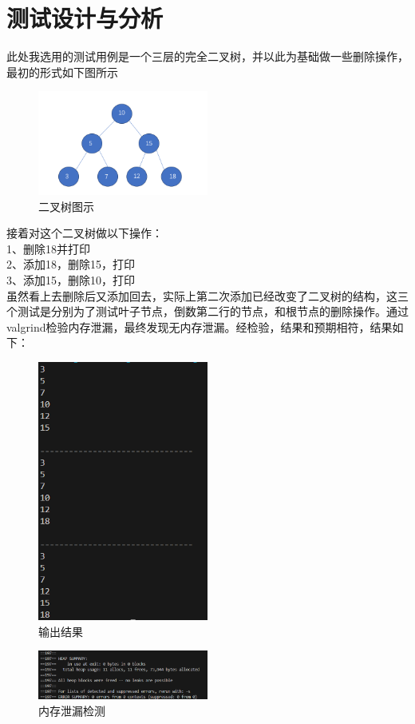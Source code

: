 \documentclass[UTF8]{ctexart}
\begin{document}
\section{测试设计与分析}
\indent 此处我选用的测试用例是一个三层的完全二叉树，并以此为基础做一些删除操作，最初的形式如下图所示
\begin{figure}[htbp] 
\centering 
\includegraphics[width=0.5\textwidth]{1.png} 
\caption{二叉树图示}
\end{figure}
\newpage
\noindent 接着对这个二叉树做以下操作：\\
1、删除18并打印\\
2、添加18，删除15，打印\\
3、添加15，删除10，打印\\
虽然看上去删除后又添加回去，实际上第二次添加已经改变了二叉树的结构，这三个测试是分别为了测试叶子节点，倒数第二行的节点，和根节点的删除操作。通过valgrind检验内存泄漏，最终发现无内存泄漏。经检验，结果和预期相符，结果如下：\\
\begin{figure}[!h] 
\centering 
\includegraphics[width=0.5\textwidth]{2.png} 
\caption{输出结果}
\end{figure}
\begin{figure}[!h] 
\centering 
\includegraphics[width=0.5\textwidth]{3.png} 
\caption{内存泄漏检测}
\end{figure}
\end{document}
